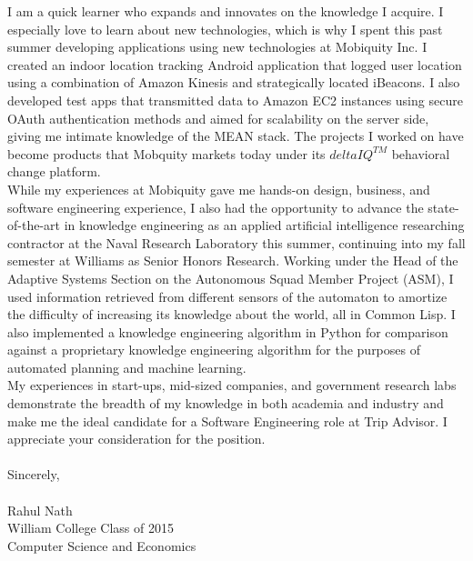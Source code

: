 \documentclass[11pt]{letter} %
\newcommand{\forceindent}{\leavevmode{\parindent=24pt\indent}}
\begin{document}
\forceindent I am a quick learner who expands and innovates on the knowledge I acquire. I especially love to learn about new technologies, which is why I spent this past summer developing applications using new technologies at Mobiquity Inc. I created an indoor location tracking Android application that logged user location using a combination of Amazon Kinesis and strategically located iBeacons. I also developed test apps that transmitted data to Amazon EC2 instances using secure OAuth authentication methods and aimed for scalability on the server side, giving me intimate knowledge of the MEAN stack. The projects I worked on have become products that Mobquity markets today under its $deltaIQ^{TM}$ behavioral change platform. \\ %

\forceindent While my experiences at Mobiquity gave me hands-on design, business, and software engineering experience, I also had the opportunity to advance the state-of-the-art in knowledge engineering as an applied artificial intelligence researching contractor at the Naval Research Laboratory this summer, continuing into my fall semester at Williams as Senior Honors Research. Working under the Head of the Adaptive Systems Section on the Autonomous Squad Member Project (ASM), I used information retrieved from different sensors of the automaton to amortize the difficulty of increasing its knowledge about the world, all in Common Lisp. I also implemented a knowledge engineering algorithm in Python for comparison against a proprietary knowledge engineering algorithm for the purposes of automated planning and machine learning. \\

\forceindent My experiences in start-ups, mid-sized companies, and government research labs demonstrate the breadth of my knowledge in both academia and industry and make me the ideal candidate for a Software Engineering role at Trip Advisor. I appreciate your consideration for the position. \\ \\

Sincerely, \\ \\
Rahul Nath \\
William College Class of 2015  \\
Computer Science and Economics



\end{document}
